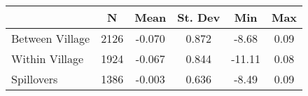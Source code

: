 \begin{tabular}{l*{5}{c}}\hline&\multicolumn{1}{c}{N}&\multicolumn{1}{c}{Mean}&\multicolumn{1}{c}{St. Dev}&\multicolumn{1}{c}{Min}&\multicolumn{1}{c}{Max}\\ \hline 
Between Village & 2126 & -0.070 & 0.872 & -8.68 & 0.09 \\
Within Village & 1924 & -0.067 & 0.844 & -11.11 & 0.08 \\
Spillovers & 1386 & -0.003 & 0.636 & -8.49 & 0.09 \\
\hline \end{tabular}
